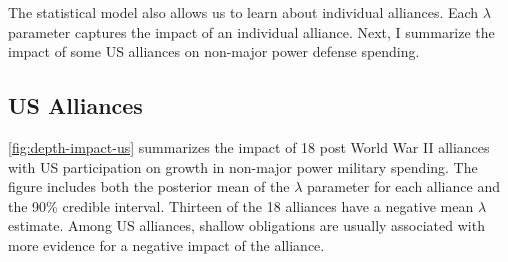 \documentclass[12pt]{article}
\begin{document}
%
%
%
%


The statistical model also allows us to learn about individual alliances. 
Each $\lambda$ parameter captures the impact of an individual alliance. 
Next, I summarize the impact of some US alliances on non-major power defense spending. 


\subsection{US Alliances}


\autoref{fig:depth-impact-us} summarizes the impact of 18 post World War II alliances with US participation on growth in non-major power military spending.
The figure includes both the posterior mean of the $\lambda$ parameter for each alliance and the 90\% credible interval. 
Thirteen of the 18 alliances have a negative mean $\lambda$ estimate. 
Among US alliances, shallow obligations are usually associated with more evidence for a negative impact of the alliance. 
\end{document}
